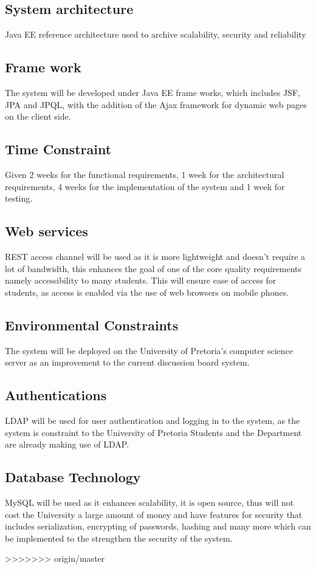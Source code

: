 \begin{flushleft}
			
\subsection*{System architecture} 
Java EE reference architecture used to archive scalability, security and reliability 

\subsection*{Frame work}
The system will be developed under Java EE frame works, which includes JSF, JPA and JPQL, with the addition of the Ajax framework for dynamic web pages on the client side.

\subsection*{Time Constraint} 
Given 2 weeks for the functional requirements, 1 week for the architectural requirements, 4 weeks for the implementation of the system and 1 week for testing.

\subsection*{Web services}
REST access channel will be used as it is more lightweight and doesn't require a lot of bandwidth, this enhances the goal of one of the core quality requirements namely accessibility to many students. This will ensure ease of access for students, as access is enabled via the use of web browsers on mobile phones.

\subsection*{Environmental Constraints}
The system will be deployed on the University of Pretoria's computer science server as an improvement to the current discussion board system.

\subsection*{Authentications}
LDAP will be used for user authentication and logging in to the system, as the system is constraint to the University of Pretoria Students and the Department are already making use of LDAP.

\subsection*{Database Technology}
MySQL will be used as it enhances scalability, it is open source, thus will not cost the University a large amount of money and have features for security that includes serialization, encrypting of passwords, hashing and many more which can be implemented to the strengthen the security of the system.
		
\end{flushleft}
>>>>>>> origin/master
